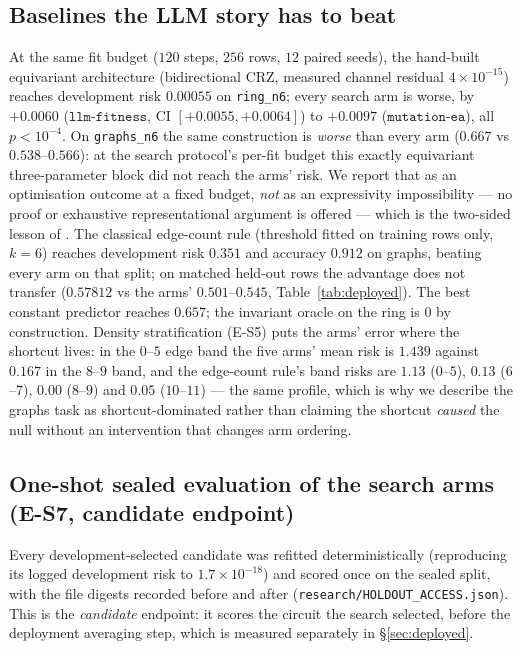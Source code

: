 \documentclass{neurips_2024}
\begin{document}
\subsection{Baselines the LLM story has to beat}
\label{sec:baselines}

At the same fit budget ($120$ steps, $256$ rows, $12$ paired seeds), the hand-built
equivariant architecture (bidirectional CRZ, measured channel residual $4\times10^{-15}$)
reaches development risk $0.00055$ on \texttt{ring\_n6}; every search arm is worse, by
$+0.0060$ ($\texttt{llm-fitness}$, CI $[+0.0055,+0.0064]$) to $+0.0097$
($\texttt{mutation-ea}$), all $p<10^{-4}$. On \texttt{graphs\_n6} the same construction is
\emph{worse} than every arm ($0.667$ vs $0.538$--$0.566$): at the search protocol's per-fit
budget this exactly equivariant three-parameter block did not reach the arms' risk. We report
that as an optimisation outcome at a fixed budget, \emph{not} as an expressivity impossibility
--- no proof or exhaustive representational argument is offered --- which is the two-sided
lesson of \cite{baumann2026}. The classical edge-count rule (threshold fitted on training rows only,
$k{=}6$) reaches development risk $0.351$ and accuracy $0.912$ on graphs, beating every arm on
that split; on matched held-out rows the advantage does not transfer
($0.57812$ vs the arms' $0.501$--$0.545$, Table~\ref{tab:deployed}).
The best constant predictor reaches $0.657$; the invariant oracle on the ring is $0$ by
construction. Density stratification (E-S5) puts the arms' error where the shortcut lives:
in the $0$--$5$ edge band the five arms' mean risk is $1.439$ against $0.167$ in the
$8$--$9$ band, and the edge-count rule's band risks are $1.13$ ($0$--$5$), $0.13$ ($6$--$7$),
$0.00$ ($8$--$9$) and $0.05$ ($10$--$11$) --- the same profile, which is
why we describe the graphs task as shortcut-dominated rather than claiming the shortcut
\emph{caused} the null without an intervention that changes arm ordering.

\subsection{One-shot sealed evaluation of the search arms (E-S7, candidate endpoint)}
\label{sec:holdout}

Every development-selected candidate was refitted deterministically (reproducing its logged
development risk to $1.7\times10^{-18}$) and scored once on the sealed split, with the file
digests recorded before and after (\texttt{research/HOLDOUT\_ACCESS.json}). This is the
\emph{candidate} endpoint: it scores the circuit the search selected, before the deployment
averaging step, which is measured separately in \S\ref{sec:deployed}.
\end{document}

